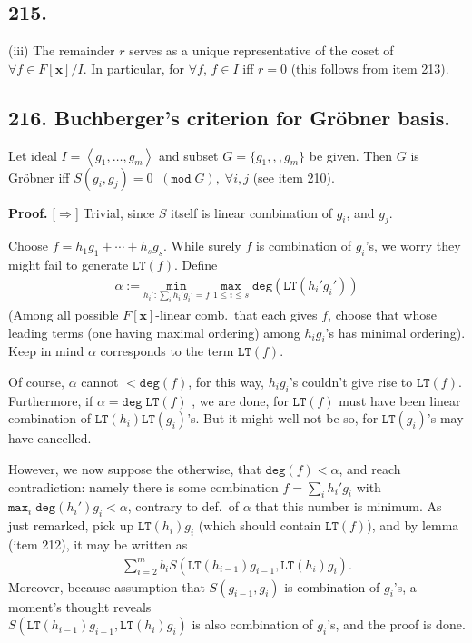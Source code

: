 \documentclass[12pt]{article}
\newcommand\aG\alpha \newcommand\bG\beta  \newcommand\gG\gamma \newcommand\dG\delta \newcommand\eG\varepsilon \newcommand\zG\zeta \newcommand\tG\vartheta \newcommand\kG\kappa \newcommand\lG\lambda \newcommand\sG\sigma \newcommand\fG\varphi \newcommand\oG\omega
\newcommand{\V}\mathbf%
\newcommand{\Ev}\forall%
\newcommand{\Ip}{\Rightarrow} %
\newcommand{\Ab}[1]{ \left\langle #1 \right\rangle } %
\newcommand{\Ss}[1]{\textsf{\bfseries{#1}}}%
\newcommand{\Tw}[1]{\texttt{#1}}%
\newcommand{\EqGo}[1]{ \begin{gather*}{#1}\end{gather*} } %
\begin{document}
\subsection*{215.} (iii) The remainder \(r\) serves as a unique representative of the coset of \(\Ev f \in F[\V{x}]/I\). 
In particular, for \(\Ev f\), \(f \in I\) iff \(r =0\) (this follows from item 213).

\subsection*{216. Buchberger's criterion for Gr\"obner basis.} Let ideal \(I =\Ab{g_1,\dotsc,g_m}\) and subset \(G =\{g_1,,,g_m\}\) be given. 
Then \(G\) is Gr\"obner iff \(S(g_i,g_j) =0\;\; (\Tw{mod}\; G),\; \Ev i,j\) (see item 210). \par
\Ss{Proof.} [\(\Ip\)] Trivial, since \(S\) itself is linear combination of \(g_i\), and \(g_j\). \par
[\(\Leftarrow\)] Choose \(f = h_1 g_1 +\dotsb+ h_s g_s\). 
While surely \(f\) is combination of \(g_i\)'s, we worry they might fail to generate \(\Tw{LT}(f)\). 
Define \EqGo{
 \aG := \underset{h_i': \sum_i h_i' g_i' =f}{\Tw{min}} \; \underset{1 \leq i \leq s}{\Tw{max}}\; \Tw{deg}(\Tw{LT}(h_i' g_i'))
} (Among all possible \(F[\V{x}]\)-linear comb.\ that each gives \(f\), choose that whose leading terms (one having maximal ordering) among \(h_i g_i\)'s has minimal ordering). 
Keep in mind \(\aG\) corresponds to the term \(\Tw{LT}(f)\). \par
Of course, \(\aG\) cannot \(< \Tw{deg}(f)\), for this way, \(h_i g_i\)'s couldn't give rise to \(\Tw{LT}(f)\). 
Furthermore, if \(\aG =\Tw{deg}\; \Tw{LT}(f)\) , we are done, for \(\Tw{LT}(f)\) must have been linear combination of \(\Tw{LT}(h_i) \Tw{LT}(g_i)\)'s. 
But it might well not be so, for \(\Tw{LT}(g_i)\)'s may have cancelled. \par
However, we now suppose the otherwise, that \(\Tw{deg}(f) <\aG\), and reach contradiction: namely there is some combination \(f = \sum_i h_i' g_i\) with \(\Tw{max}_i\; \Tw{deg}(h_i') g_i <\aG\), contrary to def.\ of \(\aG\) that this number is minimum. 
As just remarked, pick up \(\Tw{LT}(h_i) g_i\) (which should contain \(\Tw{LT}(f)\)), 
and by lemma (item 212), it may be written as \EqGo{
 \sum_{i=2}^m b_i S(\Tw{LT}(h_{i-1}) g_{i-1}, \Tw{LT}(h_i) g_i). 
} Moreover, because assumption that \(S(g_{i-1},g_i)\) is combination of \(g_i\)'s, 
a moment's thought reveals \\ \(S(\Tw{LT}(h_{i-1}) g_{i-1}, \Tw{LT}(h_i) g_i)\) is also combination of \(g_i\)'s, and the proof is done.
\end{document}

